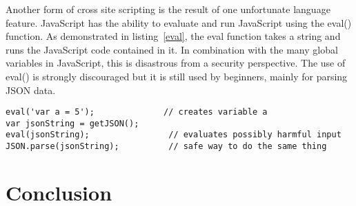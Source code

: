 \documentclass{report}
\begin{document}
Another form of cross site scripting is the result of one unfortunate language feature. JavaScript has the ability to evaluate and run JavaScript using the eval() function. As demonstrated in listing~\ref{eval}, the eval function takes a string and runs the JavaScript code contained in it. In combination with the many global variables in JavaScript, this is disastrous from a security perspective. The use of eval() is strongly discouraged but it is still used by beginners, mainly for parsing JSON data.
\begin{lstlisting}[caption={Insertion of malicious script on the client side, eval().},label={eval}]
eval('var a = 5');              // creates variable a
var jsonString = getJSON();
eval(jsonString);                // evaluates possibly harmful input
JSON.parse(jsonString);          // safe way to do the same thing
\end{lstlisting}


\section{Conclusion}

\begin{thebibliography}{99}

\end{thebibliography}
\end{document}
